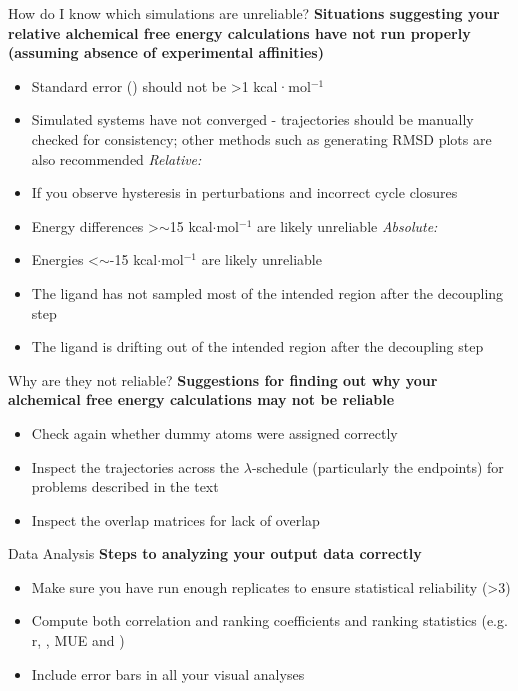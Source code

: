\documentclass[9pt,bestpractices]{livecoms}
\begin{document}
\begin{Checklists*}
\begin{checklist}{How do I know which simulations are unreliable?}
    \textbf{Situations suggesting your relative alchemical free energy calculations have not run properly (assuming absence of experimental affinities)}
        \begin{itemize}
                \item Standard error (\textsigma) should not be \textgreater1 kcal·mol$^{-1}$ 
    \item Simulated systems have not converged - trajectories should be manually checked for consistency; other methods such as generating RMSD plots are also recommended
    \newline\newline\textit{Relative:}
    \item If you observe hysteresis in perturbations and incorrect cycle closures
    \item Energy differences \textgreater$\sim$15 kcal$\cdot$mol$^{-1}$  are likely unreliable
    \newline\newline\textit{Absolute:}
    \item Energies \textless$\sim$-15 kcal$\cdot$mol$^{-1}$  are likely unreliable
    \item The ligand has not sampled most of the intended region after the decoupling step
    \item The ligand is drifting out of the intended region after the decoupling step
        \end{itemize}
\end{checklist}

\begin{checklist}{Why are they not reliable?}
    \textbf{Suggestions for finding out why your alchemical free energy calculations may not be reliable}
\begin{itemize}
    \item Check again whether dummy atoms were assigned correctly
    \item Inspect the trajectories across the $\lambda$-schedule (particularly the endpoints) for problems described in the text
    \item Inspect the overlap matrices for lack of overlap
\end{itemize}
\end{checklist}

\begin{checklist}{Data Analysis}
    \textbf{Steps to analyzing your output data correctly}
\begin{itemize}
    \item Make sure you have run enough replicates to ensure statistical reliability (\textgreater3)
    \item Compute both correlation and ranking coefficients and ranking statistics (e.g. r, \textrho, MUE and \texttau)
    \item Include error bars in all your visual analyses
\end{itemize}
\end{checklist}
\end{Checklists*}
\clearpage
\end{document}
